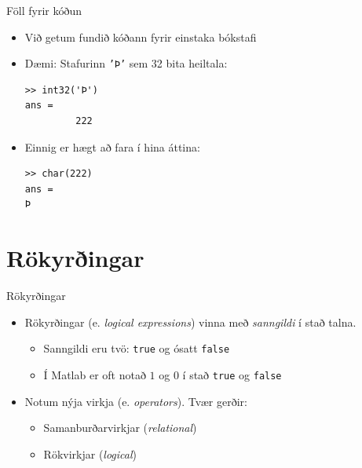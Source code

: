 \documentclass[handout]{beamer}
\begin{document}
\begin{frame}[fragile]{Föll fyrir kóðun}
\begin{itemize}
 \item Við getum fundið kóðann fyrir einstaka bókstafi
 \item Dæmi: Stafurinn \texttt{'Þ'} sem 32 bita heiltala: 
\begin{verbatim}
>> int32('Þ')
ans =
         222
\end{verbatim}
 \item Einnig er hægt að fara í hina áttina:
\begin{verbatim}
>> char(222)
ans =
Þ
\end{verbatim}
\end{itemize}
\end{frame}

\section{Rökyrðingar}

\begin{frame}{Rökyrðingar}
\begin{itemize}
 \item Rökyrðingar (e. \emph{logical expressions}) vinna með \emph{sanngildi} í stað talna.
 \begin{itemize}
  \item Sanngildi eru tvö: \texttt{true} og ósatt \texttt{false}
  \item Í Matlab er oft notað $1$ og $0$ í stað \texttt{true} og \texttt{false}
 \end{itemize}
 \item Notum nýja virkja (e. \emph{operators}). Tvær gerðir:
 \begin{itemize}
  \item Samanburðarvirkjar (\emph{relational})
  \item Rökvirkjar (\emph{logical})
 \end{itemize}
\end{itemize}
\end{frame}
\end{document}
